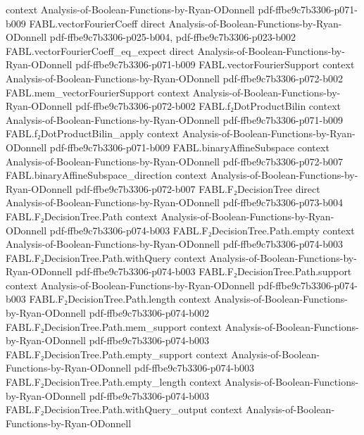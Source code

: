 \begin{theorem}
  {context}
  {Analysis-of-Boolean-Functions-by-Ryan-ODonnell}
  {pdf-ffbe9c7b3306-p071-b009}
\proofstep
  {FABL.vectorFourierCoeff}
  {direct}
  {Analysis-of-Boolean-Functions-by-Ryan-ODonnell}
  {pdf-ffbe9c7b3306-p025-b004,
    pdf-ffbe9c7b3306-p023-b002}
\proofstep
  {FABL.vectorFourierCoeff_eq_expect}
  {direct}
  {Analysis-of-Boolean-Functions-by-Ryan-ODonnell}
  {pdf-ffbe9c7b3306-p071-b009}
\proofstep
  {FABL.vectorFourierSupport}
  {context}
  {Analysis-of-Boolean-Functions-by-Ryan-ODonnell}
  {pdf-ffbe9c7b3306-p072-b002}
\proofstep
  {FABL.mem_vectorFourierSupport}
  {context}
  {Analysis-of-Boolean-Functions-by-Ryan-ODonnell}
  {pdf-ffbe9c7b3306-p072-b002}
\proofstep
  {FABL.f₂DotProductBilin}
  {context}
  {Analysis-of-Boolean-Functions-by-Ryan-ODonnell}
  {pdf-ffbe9c7b3306-p071-b009}
\proofstep
  {FABL.f₂DotProductBilin_apply}
  {context}
  {Analysis-of-Boolean-Functions-by-Ryan-ODonnell}
  {pdf-ffbe9c7b3306-p071-b009}
\proofstep
  {FABL.binaryAffineSubspace}
  {context}
  {Analysis-of-Boolean-Functions-by-Ryan-ODonnell}
  {pdf-ffbe9c7b3306-p072-b007}
\proofstep
  {FABL.binaryAffineSubspace_direction}
  {context}
  {Analysis-of-Boolean-Functions-by-Ryan-ODonnell}
  {pdf-ffbe9c7b3306-p072-b007}
\proofstep
  {FABL.F₂DecisionTree}
  {direct}
  {Analysis-of-Boolean-Functions-by-Ryan-ODonnell}
  {pdf-ffbe9c7b3306-p073-b004}
\proofstep
  {FABL.F₂DecisionTree.Path}
  {context}
  {Analysis-of-Boolean-Functions-by-Ryan-ODonnell}
  {pdf-ffbe9c7b3306-p074-b003}
\proofstep
  {FABL.F₂DecisionTree.Path.empty}
  {context}
  {Analysis-of-Boolean-Functions-by-Ryan-ODonnell}
  {pdf-ffbe9c7b3306-p074-b003}
\proofstep
  {FABL.F₂DecisionTree.Path.withQuery}
  {context}
  {Analysis-of-Boolean-Functions-by-Ryan-ODonnell}
  {pdf-ffbe9c7b3306-p074-b003}
\proofstep
  {FABL.F₂DecisionTree.Path.support}
  {context}
  {Analysis-of-Boolean-Functions-by-Ryan-ODonnell}
  {pdf-ffbe9c7b3306-p074-b003}
\proofstep
  {FABL.F₂DecisionTree.Path.length}
  {context}
  {Analysis-of-Boolean-Functions-by-Ryan-ODonnell}
  {pdf-ffbe9c7b3306-p074-b002}
\proofstep
  {FABL.F₂DecisionTree.Path.mem_support}
  {context}
  {Analysis-of-Boolean-Functions-by-Ryan-ODonnell}
  {pdf-ffbe9c7b3306-p074-b003}
\proofstep
  {FABL.F₂DecisionTree.Path.empty_support}
  {context}
  {Analysis-of-Boolean-Functions-by-Ryan-ODonnell}
  {pdf-ffbe9c7b3306-p074-b003}
\proofstep
  {FABL.F₂DecisionTree.Path.empty_length}
  {context}
  {Analysis-of-Boolean-Functions-by-Ryan-ODonnell}
  {pdf-ffbe9c7b3306-p074-b003}
\proofstep
  {FABL.F₂DecisionTree.Path.withQuery_output}
  {context}
  {Analysis-of-Boolean-Functions-by-Ryan-ODonnell}

\end{theorem}
